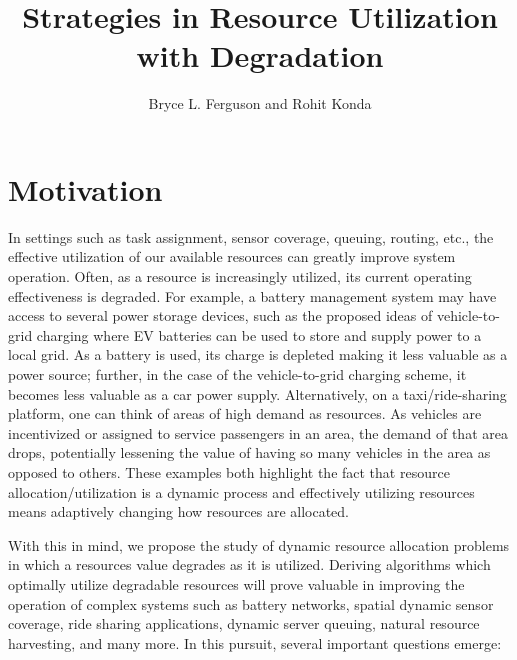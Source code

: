 \documentclass[letterpaper, 10 pt, conference]{ieeeconf}
\begin{document}
\title{Strategies in Resource Utilization with Degradation}




\author{Bryce L. Ferguson and Rohit Konda}


\maketitle
\thispagestyle{empty}

\section{Motivation}
\label{sec:int}



In settings such as task assignment, sensor coverage, queuing, routing, etc., the effective utilization of our available resources can greatly improve system operation.
Often, as a resource is increasingly utilized, its current operating effectiveness is degraded.
For example, a battery management system may have access to several power storage devices, such as the proposed ideas of vehicle-to-grid charging where EV batteries can be used to store and supply power to a local grid.
As a battery is used, its charge is depleted making it less valuable as a power source; further, in the case of the vehicle-to-grid charging scheme, it becomes less valuable as a car power supply.
Alternatively, on a taxi/ride-sharing platform, one can think of areas of high demand as resources. 
As vehicles are incentivized or assigned to service passengers in an area, the demand of that area drops, potentially lessening the value of having so many vehicles in the area as opposed to others.
These examples both highlight the fact that resource allocation/utilization is a dynamic process and effectively utilizing resources means adaptively changing how resources are allocated.

With this in mind, we propose the study of dynamic resource allocation problems in which a resources value degrades as it is utilized.
Deriving algorithms which optimally utilize degradable resources will prove valuable in improving the operation of complex systems such as battery networks, spatial dynamic sensor coverage, ride sharing applications, dynamic server queuing, natural resource harvesting, and many more.
In this pursuit, several important questions emerge:
\end{document}

